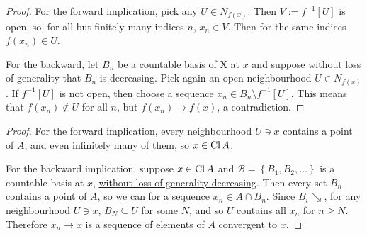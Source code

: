 
\begin{proof} 
    For the forward implication, pick any \( U \in N_{f(x)} \). Then \( V := f^{-1}[U] \) is open, so, for all but finitely many indices \( n \), \( x_n \in V \). Then for the same indices \( f(x_n) \in U \).

    For the backward, let \( B_n \) be a countable basis of X at \( x \) and suppose without loss of generality that \( B_n \) is decreasing. Pick again an open neighbourhood \( U \in N_{f(x)} \). If \( f^{-1}[U] \) is not open, then choose a sequence \( x_n \in B_n \setminus f^{-1}[U] \). This means that \( f(x_n) \not\in U \) for all \( n \), but \( f(x_n) \to f(x) \), a contradiction.
\end{proof}


\begin{proof}
    For the forward implication, every neighbourhood \( U \ni x \) contains a point of \( A \), and even infinitely many of them, so \( x \in \operatorname{Cl} A \).

    For the backward implication, suppose \( x \in \operatorname{Cl} A \) and \( \mathcal{B} = \left\{ B_1, B_2, \ldots \right\} \) is a countable basis at \( x \), \hyperlink{PointBasisDecreasing}{without loss of generality decreasing}. Then every set \( B_n \) contains a point of \( A \), so we can for a sequence \( x_n \in A \cap B_n \). Since \( B_i \searrow \), for any neighbourhood \( U \ni x \), \( B_N \subseteq U \) for some \( N \), and so \( U \) contains all \( x_n \) for \( n \geqslant N \). Therefore \( x_n \to x \) is a sequence of elements of \( A \) convergent to \( x \).
\end{proof}


